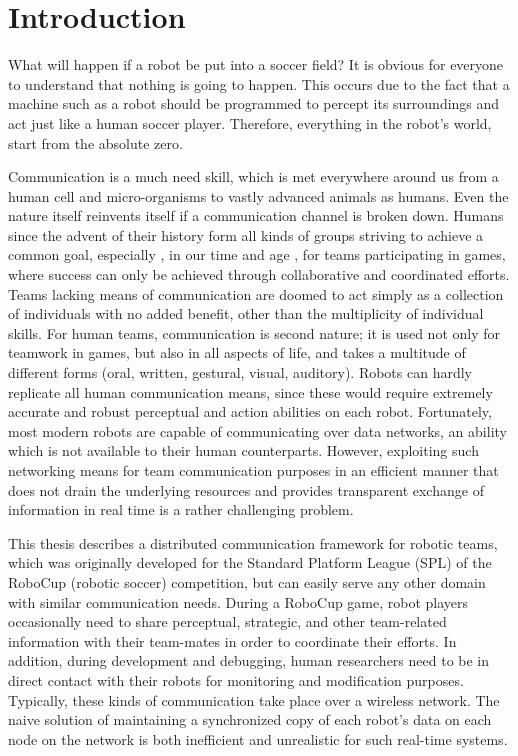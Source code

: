 \chapter{Introduction}
\label{intro}
What will happen if a robot be put into a soccer field? It is obvious for everyone to understand that nothing is going to happen. This occurs due to the fact that a machine such as a robot should be programmed to percept its surroundings and act just like a human soccer player. Therefore, everything in the robot's world, start from the absolute zero.





Communication is a much need skill, which is met everywhere around us from a human cell and micro-organisms to vastly advanced animals as humans. Even the nature itself reinvents itself if a communication channel is broken down. Humans since the advent of their history form all kinds of groups striving to achieve a common goal, especially , in our time and age ,
for teams participating in games, where success can only be achieved through collaborative and coordinated efforts.
Teams lacking means of communication are doomed to act simply as a collection of individuals with no added benefit,
other than the multiplicity of individual skills. For human teams, communication is second nature; it is used not only
for teamwork in games, but also in all aspects of life, and takes a multitude of different forms (oral, written,
gestural, visual, auditory). Robots can hardly replicate all human communication means, since these would require
extremely accurate and robust perceptual and action abilities on each robot. Fortunately, most modern robots are capable
of communicating over data networks, an ability which is not available to their human counterparts. However, exploiting
such networking means for team communication purposes in an efficient manner that does not drain the underlying
resources and provides transparent exchange of information in real time is a rather challenging problem. 


This thesis describes a distributed communication framework for robotic teams, which was originally developed for the
Standard Platform League (SPL) of the RoboCup (robotic soccer) competition, but can easily serve any other domain with
similar communication needs. During a RoboCup game, robot players occasionally need to share perceptual, strategic, and
other team-related information with their team-mates in order to coordinate their efforts. In addition, during
development and debugging, human researchers need to be in direct contact with their robots for monitoring and
modification purposes. Typically, these kinds of communication take place over a wireless network. The naive solution of
maintaining a synchronized copy of each robot's data on each node on the network is both inefficient and unrealistic for
such real-time systems. 

